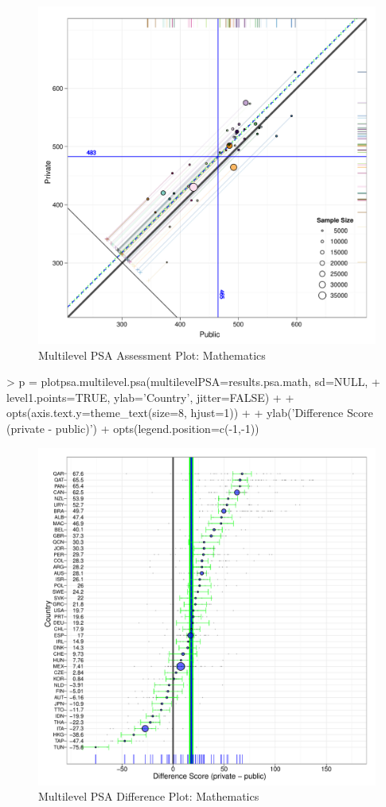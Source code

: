 \documentclass[nojss]{jss}
\begin{document}
\clearpage
\begin{figure}[tp]
\begin{center}
\includegraphics{multilevelPSA-021}
\caption{Multilevel PSA Assessment Plot: Mathematics}
\label{fig:circpsamath}
\end{center}
\end{figure}

\begin{Schunk}
\begin{Sinput}
> p = plotpsa.multilevel.psa(multilevelPSA=results.psa.math, sd=NULL, 
+ level1.points=TRUE, ylab='Country', jitter=FALSE) + 
+ opts(axis.text.y=theme_text(size=8, hjust=1)) + 
+ ylab('Difference Score (private - public)') + opts(legend.position=c(-1,-1))
\end{Sinput}
\end{Schunk}

\clearpage
\begin{figure}[tp]
\begin{center}
\includegraphics{multilevelPSA-023}
\caption{Multilevel PSA Difference Plot: Mathematics}
\label{fig:diffpsamath}
\end{center}
\end{figure}
\end{document}
